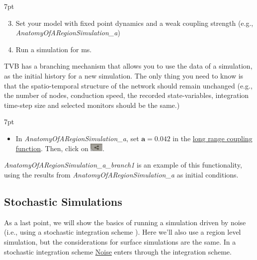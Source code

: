 \documentclass{tufte-handout}
\newenvironment{simulation}{%
  \def\FrameCommand{%
    \hspace{1pt}%
    {\color{ForestGreen}\vrule width 2pt}%
    {\color{simulationshade}\vrule width 4pt}%
    \colorbox{simulationshade}%
  }%
  \MakeFramed{\advance\hsize-\width\FrameRestore}%
  \noindent\hspace{-4.55pt}%
  \begin{adjustwidth}{}{7pt}%
  \vspace{2pt}\vspace{2pt}%
}
{%
  \vspace{2pt}\end{adjustwidth}\endMakeFramed%
}
\begin{document}
\begin{simulation}
\begin{enumerate}[resume]
 \setcounter{enumi}{2}
\item Set your model with fixed point dynamics and a weak coupling strength (e.g., \textit{AnatomyOfARegionSimulation\_a})
\item Run a simulation for \unit[1000]{ms}.
\end{enumerate}
\end{simulation}

TVB has a branching mechanism that allows you to use the data of a simulation, as the initial history for a new simulation. The only thing you
need to know is that the spatio-temporal structure of the network should
remain unchanged (e.g., the number of nodes, conduction speed, the recorded state-variables, integration time-step size and selected monitors should be the same.)

\begin{simulation}
\begin{itemize}[resume]
 \setcounter{enumi}{4}
 \item In \textit{AnatomyOfARegionSimulation\_a}, set $\mathbf{a=0.042}$ in the \underline{long range coupling function}. Then, click on \includegraphics[width=0.05\textwidth]{butt_branching.png}. 
\end{itemize}
\end{simulation}

\textit{AnatomyOfARegionSimulation\_a\_branch1} is an example of this functionality, using the results from \textit{AnatomyOfARegionSimulation\_a} as initial conditions. 

\subsection{Stochastic Simulations}\label{sec:noisy_simulations}


As a last point, we will show the basics of running a simulation driven by
noise (i.e., using a stochastic integration scheme ). Here we'll also use a region
level simulation, but the considerations for surface simulations are the same.
In a stochastic integration scheme \underline{Noise} enters through the integration
scheme. 
\end{document}
